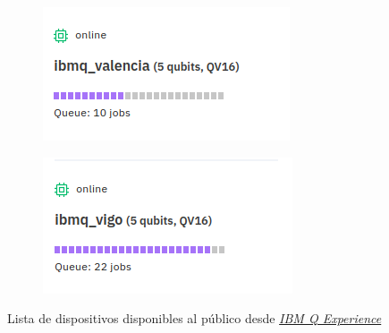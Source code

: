 \begin{figure}[H]
\begin{subfigure}{0.19\linewidth}
    \end{subfigure}
    \begin{subfigure}{0.19\linewidth}
        \centering
        \includegraphics[scale=0.35]{images/valencia.png}
    \end{subfigure}
    \begin{subfigure}{0.19\linewidth}
        \centering
        \includegraphics[scale=0.35]{images/vigo.png}
    \end{subfigure}
    \caption{Lista de dispositivos disponibles al público desde \href{https://quantum-computing.ibm.com/}{\textit{IBM Q Experience}}}
\end{figure}